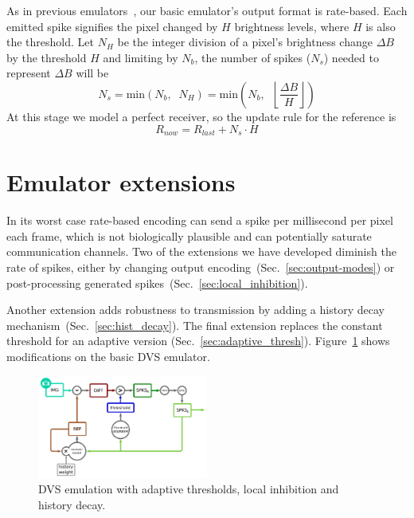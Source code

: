 \documentclass[conference]{IEEEtran}
\begin{document}
As in previous emulators~\cite{DVSemu}, our basic emulator's output format is rate-based. Each emitted spike signifies the pixel changed by $H$ brightness levels, where $H$ is also the threshold. Let $N_{H}$ be the integer division of a pixel's brightness change $\Delta B$ by the threshold $H$ and limiting by $N_{b}$, the number of spikes ($N_{s}$) needed to represent $\Delta B$ will be
\begin{equation}
  \label{eq:num_spikes_rate}
  N_{s} = \mathrm{min}\left( N_{b}, \;\; N_{H} \right) 
        = \mathrm{min}\left( N_{b}, \;\; \left\lfloor\frac{\Delta B}{H}\right\rfloor \right)
\end{equation}
At this stage we model a perfect receiver, so the update rule for the reference is
\begin{equation}
  \label{eq:ref_update}
  R_{now} = R_{last} + N_{s}\cdot H
\end{equation}


\section{Emulator extensions}
\label{sec:emu-extensions}
In its worst case rate-based encoding can send a spike per millisecond per pixel each frame, which is not biologically plausible and can potentially saturate communication channels. 
Two of the extensions we have developed diminish the rate of spikes, either by changing output encoding~(Sec.~\ref{sec:output-modes}) or post-processing generated spikes~(Sec.~\ref{sec:local_inhibition}). 

Another extension adds robustness to transmission by adding a history decay mechanism~(Sec.~\ref{sec:hist_decay}). The final extension replaces the constant threshold for an adaptive version (Sec.~\ref{sec:adaptive_thresh}). Figure~\ref{fig:dvs_emu_inh} shows modifications on the basic DVS emulator.  
\begin{figure}[htb]
  
  \includegraphics[width=0.5\textwidth]{dvs_emu_decay_adapt_inh}
  \caption{DVS emulation with adaptive thresholds, local inhibition and history decay.}
  \label{fig:dvs_emu_inh}
\end{figure}
\end{document}
